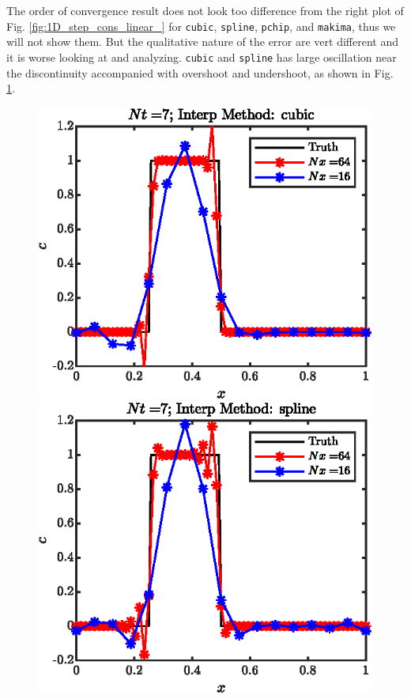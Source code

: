 \documentclass[11pt,letterpaper]{article}
\begin{document}
The order of convergence result does not look too difference from the right plot of Fig. \ref{fig:1D_step_cons_linear_} for \texttt{cubic}, \texttt{spline}, \texttt{pchip}, and \texttt{makima}, thus we will not show them. But the qualitative nature of the error are vert different and it is worse looking at and analyzing. \texttt{cubic} and \texttt{spline} has large oscillation near the discontinuity accompanied with overshoot and undershoot, as shown in Fig. \ref{fig:1D_step_cons_cubic_sol}.
\begin{figure}[H]
    \centering
    \includegraphics{figs/1D_step_cons_cubic_sol}
    \includegraphics{figs/1D_step_cons_spline_sol}
    \caption{}\label{fig:1D_step_cons_cubic_sol}
\end{figure}
\end{document}
